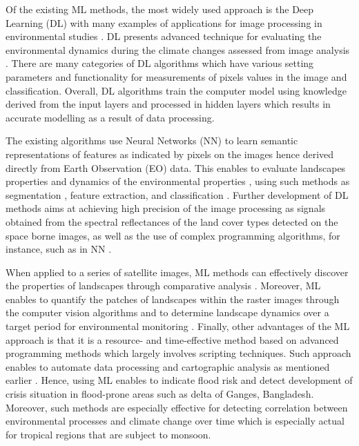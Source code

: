 \documentclass[water,article,submit,pdftex,moreauthors]{Definitions/mdpi}
\begin{document}
Of the existing ML methods, the most widely used approach is the Deep Learning (DL) with many examples of applications for image processing in environmental studies \cite{10441152,AHMED2024167234,HASSAN2023100399}. DL presents advanced technique for evaluating the environmental dynamics during the climate changes assessed from image analysis \cite{10441576}. There are many categories of DL algorithms which have various setting parameters and functionality for measurements of pixels values in the image and classification. Overall, DL algorithms train the computer model using knowledge derived from the input layers and processed in hidden layers which results in accurate modelling as a result of data processing.

The existing algorithms use Neural Networks (NN) to learn semantic representations of features as indicated by pixels on the images hence derived directly from Earth Observation (EO) data. This enables to evaluate landscapes properties and dynamics of the environmental properties \cite{BISWAS2023e21245}, using such methods as segmentation \cite{Lemenkova202320}, feature extraction, and classification \cite{RAISA2024101128}. Further development of DL methods aims at achieving high precision of the image processing as signals obtained from the spectral reflectances of the land cover types detected on the space borne images, as well as the use of complex programming algorithms, for instance, such as in NN \cite{RUDRA2023e16459}. 

When applied to a series of satellite images, ML methods can effectively discover the properties of landscapes through comparative analysis \cite{9324433,Lemenkova202313}. Moreover, ML enables to quantify the patches of landscapes within the raster images through the computer vision algorithms\cite{10281789,jmse11040871,8899013,Lemenkova202021,9333522} and to determine landscape dynamics over a target period for environmental monitoring \cite{9392684,Lemenkova202324}. Finally, other advantages of the ML approach is that it is a resource- and time-effective method based on advanced programming methods which largely involves scripting techniques. Such approach enables to automate data processing and cartographic analysis as mentioned earlier \cite{10282693,Lemenkova202301,10441504}. Hence, using ML enables to indicate flood risk and detect development of crisis situation in flood-prone areas such as delta of Ganges, Bangladesh. Moreover, such methods are especially effective for  detecting correlation between environmental processes and climate change over time which is especially actual for tropical regions that are subject to monsoon. 
\end{document}
